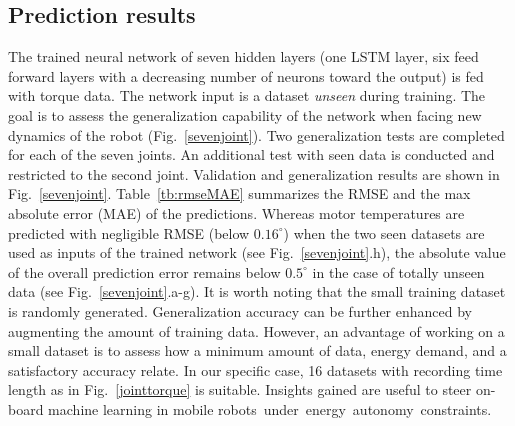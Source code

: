 \documentclass{ifacconf}
\begin{document}
\subsection{Prediction results}
The trained neural network of seven hidden layers (one LSTM layer, six feed forward  layers with a decreasing number of neurons toward the output) is fed with torque data. The network input is a  dataset \textit{unseen} during training.  The goal is to  assess the generalization capability of the network when facing new dynamics of the robot (Fig.~\ref{sevenjoint}). Two generalization tests are completed for each of the seven joints.  An additional test with seen data is conducted and restricted to the second joint. Validation and generalization results are shown in Fig.~\ref{sevenjoint}. Table~\ref{tb:rmseMAE} summarizes the RMSE and the max absolute error (MAE) of the predictions. 
Whereas motor temperatures are predicted with negligible RMSE (below $0.16^\circ$) 
when the two seen  datasets are used as inputs of the trained network (see Fig.~\ref{sevenjoint}.h), the absolute value of the overall prediction error remains below $0.5^\circ$ in the case of totally unseen data (see  Fig.~\ref{sevenjoint}.a-g). 
It is worth noting that the small training dataset is randomly generated. Generalization accuracy can be further enhanced by augmenting the amount of training data. However, an advantage of working on a small dataset is to assess how a minimum amount of data, energy demand, and a satisfactory accuracy relate. In our specific case, 16 datasets with recording time length as in Fig.~\ref{jointtorque} is suitable. Insights gained are useful to steer on-board machine learning in  mobile \mbox{robots under energy autonomy constraints.}
\begin{table}[t!]
  \begin{center}
  \caption{RMSE and MAE of Fig.~\ref{sevenjoint} a-h.The first RMSE and MAE values refer to the upper, the second values refer to the lower plots of the respective motor temperatures.}\label{tb:rmseMAE}
  \end{center}
\end{table}
\end{document}
